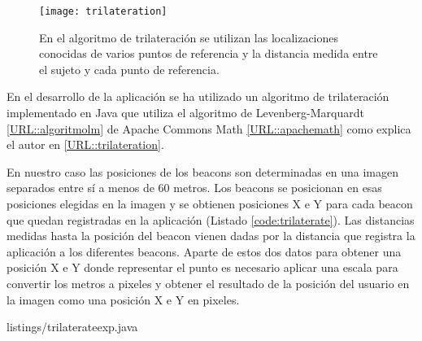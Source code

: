 \begin{figure}[H]
	\centering
	\texttt{[image: trilateration]}
	\caption{En el algoritmo de trilateración se utilizan las localizaciones conocidas de varios puntos de referencia y la distancia medida entre el sujeto y cada punto de referencia.}
	\label{fig:trilateration}
\end{figure}


En el desarrollo de la aplicación se ha utilizado un algoritmo de trilateración implementado en Java que utiliza el algoritmo de Levenberg-Marquardt \ref{URL::algoritmolm} de Apache Commons Math \ref{URL::apachemath} como explica el autor en \ref{URL::trilateration}. 


En nuestro caso las posiciones de los beacons son determinadas en una imagen separados entre sí a menos de 60 metros. Los beacons se posicionan en esas posiciones elegidas en la imagen y se obtienen posiciones X e Y para cada beacon que quedan registradas en la aplicación (Listado \ref{code:trilaterate}). Las distancias medidas hasta la posición del beacon vienen dadas por la distancia que registra la aplicación a los diferentes beacons. Aparte de estos dos datos para obtener una posición X e Y donde representar el punto es necesario aplicar una escala para convertir los metros a pixeles y obtener el resultado de la posición del usuario en la imagen como una posición X e Y en pixeles.


{listings/trilaterateexp.java} %
